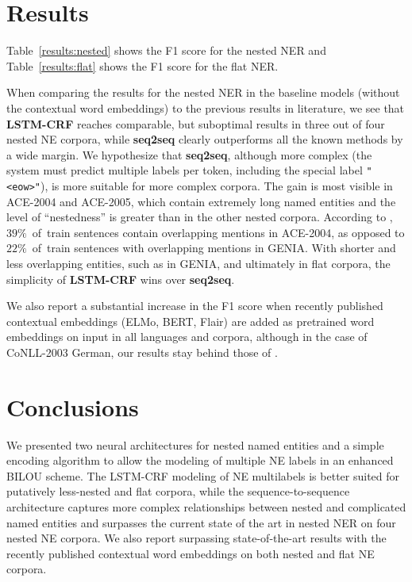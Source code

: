 \documentclass[11pt,a4paper]{article}
\begin{document}
\section{Results}
\label{section:results}

Table~\ref{results:nested} shows the F1 score for the nested NER and
Table~\ref{results:flat} shows the F1 score for the flat NER.

When comparing the results for the nested NER in the baseline models (without the
contextual word embeddings) to the previous results in literature, we see that
\textbf{LSTM-CRF} reaches comparable, but suboptimal results in three out of
four nested NE corpora, while \textbf{seq2seq} clearly outperforms all the
known methods by a wide margin. We hypothesize that \textbf{seq2seq}, although
more complex (the system must predict multiple labels per token, including the
special label \texttt{"<eow>"}), is more suitable for more complex corpora. The
gain is most visible in ACE-2004 and ACE-2005, which contain extremely long
named entities and the level of ``nestedness'' is greater than in the other
nested corpora. According to \citet{Wang2018}, $39\%$~of~train sentences contain
overlapping mentions in ACE-2004, as opposed to $22\%$~of~train sentences with
overlapping mentions in GENIA. With shorter and less overlapping entities, such
as in GENIA, and ultimately in flat corpora, the simplicity of
\textbf{LSTM-CRF} wins over \textbf{seq2seq}.

We also report a substantial increase in the F1 score when recently published
contextual embeddings (ELMo, BERT, Flair) are added as pretrained word embeddings on input
\cite{Peters2018,BERT,Akbik} in all languages and corpora, although in the case of
CoNLL-2003 German, our results stay behind those of \citet{Akbik}.

\section{Conclusions}

We presented two neural architectures for nested named entities and a simple
encoding algorithm to allow the modeling of multiple NE labels in an enhanced
BILOU scheme. The LSTM-CRF modeling of NE multilabels is better suited for
putatively less-nested and flat corpora, while the sequence-to-sequence
architecture captures more complex relationships between nested and complicated
named entities and surpasses the current state of the art in nested NER on four
nested NE corpora. We also report surpassing state-of-the-art results with the recently published contextual word embeddings on both nested and flat NE corpora.
\end{document}
